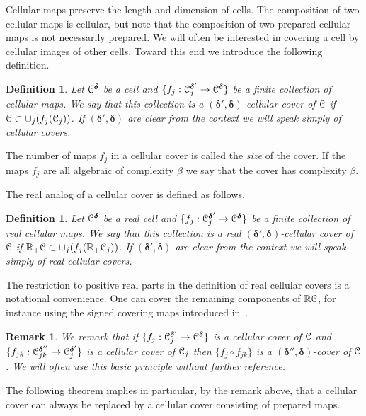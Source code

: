 \documentclass[reqno]{amsart}
\newtheorem{Def}[Cor]{Definition}{\bfseries}{\rmfamily}
\newtheorem{Rem}[Cor]{Remark}{\scshape}{\rmfamily}
\renewcommand\~[1]{\widetilde{#1}}
\def\vdelta{{\boldsymbol\delta}}
\begin{document}
Cellular maps preserve the length and dimension of cells. The
composition of two cellular maps is cellular, but note that the
composition of two prepared cellular maps is not necessarily
prepared. We will often be interested in covering a cell by cellular
images of other cells. Toward this end we introduce the following
definition.

\begin{Def}\label{def:cell-cover}
  Let $\cC^\vdelta$ be a cell and
  $\{f_j:\cC_j^{\vdelta'}\to\cC^\vdelta\}$ be a finite collection of
  cellular maps. We say that this collection is a
  \emph{$(\vdelta',\vdelta)$-cellular cover} of ${\mathcal C}$ if
  ${\mathcal C}\subset\cup_j(f_j({\mathcal C}_j))$. If $(\vdelta',\vdelta)$ are clear
  from the context we will speak simply of cellular covers.
\end{Def}

The number of maps $f_j$ in a cellular cover is called the \emph{size}
of the cover. If the maps $f_j$ are all algebraic of complexity
$\beta$ we say that the cover has complexity $\beta$.

The real analog of a cellular cover is defined as follows.

\begin{Def}\label{def:real-cell-cover}
  Let $\cC^\vdelta$ be a real cell and
  $\{f_j:\cC_j^{\vdelta'}\to\cC^\vdelta\}$ be a finite collection of
  real cellular maps. We say that this collection is a \emph{real
    $(\vdelta',\vdelta)$-cellular cover} of ${\mathcal C}$ if
  ${\mathbb R}_+{\mathcal C}\subset\cup_j(f_j({\mathbb R}_+{\mathcal C}_j))$. If $(\vdelta',\vdelta)$ are
  clear from the context we will speak simply of real cellular covers.
\end{Def}

The restriction to positive real parts in the definition of real
cellular covers is a notational convenience. One can cover the
remaining components of ${\mathbb R}{\mathcal C}$, for instance using the signed
covering maps introduced in~.

\begin{Rem}
  We remark that if $\{f_j:\cC_j^{\vdelta'}\to\cC^{\vdelta}\}$ is a
  cellular cover of ${\mathcal C}$ and
  $\{f_{jk}:\cC_{jk}^{\vdelta''}\to\cC_j^{\vdelta'}\}$ is a cellular cover
  of ${\mathcal C}_j$ then $\{f_j\circ f_{jk}\}$ is a $(\vdelta'',\vdelta)$-cover
  of ${\mathcal C}$. We will often use this basic principle without further
  reference.
\end{Rem}

The following theorem implies in particular, by the remark above, that
a cellular cover can always be replaced by a cellular cover consisting
of prepared maps.
\end{document}
